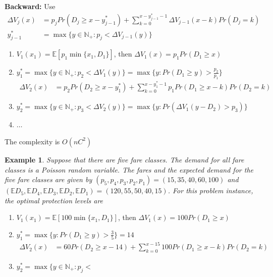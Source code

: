 \documentclass[11pt,a4paper]{article}
\newtheorem{example}{Example}
\begin{document}
\textbf{Backward:}
Use
\begin{equation}
    \begin{aligned}
        \Delta V_j(x)&=
            p_jPr(D_j\geq x-y_{j-1}^*)+\sum_{k=0}^{x-y_{j-1}^*-1}\Delta V_{j-1}(x-k)Pr(D_j=k)\\
        y_{j-1}^*&=\max\{y\in \mathbb{N}_+: p_j<\Delta V_{j-1}(y) \}
    \end{aligned}
    \nonumber
\end{equation}
\begin{enumerate}
    \item $V_1(x_1)=\mathbb{E}[p_1\min\{x_1, D_1\}]$, then $\Delta V_{1}(x)=p_1 Pr(D_1\geq x)$
    \item $y_1^*=\max\{y\in \mathbb{N}_+: p_2<\Delta V_{1}(y) \}=\max\{y:Pr(D_1\geq y)>\frac{p_2}{p_1}\}$
    \begin{equation}
        \begin{aligned}
            \Delta V_2(x)&=p_2Pr(D_2\geq x-y_{1}^*)+\sum_{k=0}^{x-y_{1}^*-1}p_1 Pr(D_1\geq x-k)Pr(D_2=k)
        \end{aligned}
        \nonumber
    \end{equation}
    \item $y_2^*=\max\{y\in \mathbb{N}_+: p_3<\Delta V_{2}(y)\}=\max\{y: Pr(\Delta V_{1}(y-D_2)>p_3)\}$
    \item $\dots$
\end{enumerate}

The complexity is $O(nC^2)$

\begin{example}
    Suppose that there are five fare classes. The demand for all fare classes is a Poisson random variable. The fares and the expected demand for the
    five fare classes are given by $(p_5, p_4, p_3, p_2, p_1) = (15, 35, 40, 60, 100)$ and $(\mathbb{E}{D_5}, \mathbb{E}{D_4}, \mathbb{E}{D_3}, \mathbb{E}{D_2}, \mathbb{E}{D_1}) = (120, 55, 50, 40, 15)$. For this problem instance, the optimal protection levels are
\end{example}
\begin{enumerate}
    \item $V_1(x_1)=\mathbb{E}[100\min\{x_1, D_1\}]$, then $\Delta V_{1}(x)=100 Pr(D_1\geq x)$
    \item $y_1^*=\max\{y:Pr(D_1\geq y)>\frac{3}{5}\}=14$
    \begin{equation}
        \begin{aligned}
            \Delta V_2(x)&=60Pr(D_2\geq x-14)+\sum_{k=0}^{x-15}100 Pr(D_1\geq x-k)Pr(D_2=k)
        \end{aligned}
        \nonumber
    \end{equation}
    \item $y_2^*=\max\{y\in \mathbb{N}_+: p_j<$
\end{enumerate}
\end{document}
